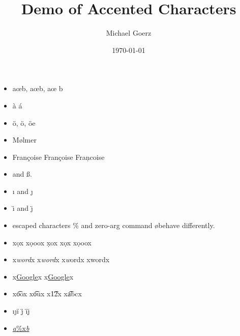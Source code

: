 \documentclass[aps,pra,onecolumn,noshowpacs,superscriptaddress,preprintnumbers,%
kamsmath,amssymb,notitlepage,letterpaper]{revtex4-2}
\def\Author{Michael Goerz}
\def\Title{Demo of Accented Characters}
\begin{document}
\title{\Title}
\author{\Author}
\date{\today}

\maketitle


\begin{itemize}
  \item a\oe b, a\oe   b, a\oe{} b
  \item \`a \'a
  \item \"o, \"{o}, \"{oe}
  \item M{\o}lmer
  \item Fran\c{c}oise Fran{\c c}oise Fran\c{}coise
  \item {\SS} and \ss.
  \item {\i} and {\j}
  \item {\"\i} and {\"\j}
  \item escaped characters \% and zero-arg command \o behave differently.
  \item x\d{o}x x\d{ooo}x x\d{}ox x\d ox x\d ooox
  \item x\emph{word}x x\emph {word}x x\emph wordx x\emph{}wordx
  \item x\href{http://www.google.com}{Google}x x\href {http://www.google.com} {Google}x
  \item x\t{oo}x x\t{ou}x x\t{12}x x\t{abc}x
  \item \i\j \"i \"j \"\i \"\j
  \item \href{a}{\textit{a}\%x\textit{b}}
\end{itemize}

\end{document}
